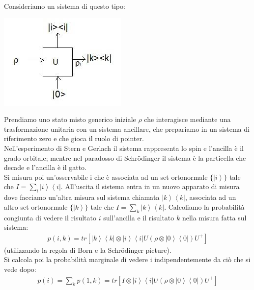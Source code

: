Consideriamo un sistema di questo tipo:
\begin{center}
\includegraphics[scale=0.5]{immagini/von-neumann.jpg} %
\end{center}
Prendiamo uno stato misto generico iniziale $\rho$ che interagisce mediante una trasformazione unitaria con un sistema ancillare, che prepariamo in un sistema di riferimento zero e che gioca il ruolo di pointer.\\
Nell'esperimento di Stern e Gerlach il sistema rappresenta lo spin e l'ancilla è il grado orbitale; mentre nel paradosso di Schrödinger il sistema è la particella che decade e l'ancilla è il gatto.\\
Si misura poi un'osservabile i che è associata ad un set ortonormale $\{\left|i\right\rangle\}$ tale che $I=\sum_{i}\left|i\right\rangle\left\langle i\right|$.
All'uscita il sistema entra in un nuovo apparato di misura dove facciamo un'altra misura sul sistema chiamata $\left|k\right\rangle\left\langle k\right|$, associata ad un altro set ortonormale $\{\left|k\right\rangle\}$ tale che $I=\sum_{k}\left|k\right\rangle\left\langle k\right|$.
Calcoliamo la probabilità congiunta di vedere il risultato $i$ sull'ancilla e il risultato $k$ nella misura fatta sul sistema:
\begin{equation}\begin{split}
p(i,k)=tr[\left|k\right\rangle\left\langle k \right|\otimes\left|i\right\rangle\left\langle i \right| U (\rho\otimes \left|0\right\rangle\left\langle 0\right|)U^+]
\end{split}\end{equation}
(utilizzando la regola di Born e la Schrödinger picture). \\
Si calcola poi la probabilità marginale di vedere i indipendentemente da ciò che si vede dopo:
\begin{equation}\begin{split}
p(i)=\sum_{k}p(1,k)=tr[I\otimes \left|i\right\rangle \left\langle i\right| U (\rho\otimes \left|0\right\rangle\left\langle 0\right|) U^+]
\end{split}\end{equation}
